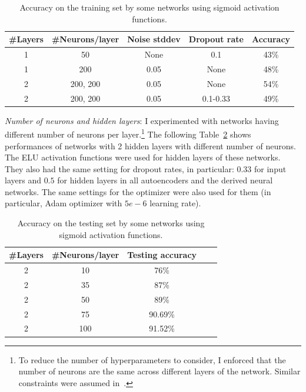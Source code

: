 \documentclass[12pt]{article}
\begin{document}
\begin{table}
\begin{center}
\begin{tabular}{|c|c|c|c|c|}
\hline
\#Layers & \#Neurons/layer & Noise stddev & Dropout rate & Accuracy \\ \hline \hline
1 & 50 & None & 0.1 & 43\% \\ \hline
1 & 200 & 0.05 & None & 48\% \\ \hline
2 & 200, 200 & 0.05 & None & 54\% \\ \hline
2 & 200, 200 & 0.05 & 0.1-0.33 & 49\% \\ \hline
\end{tabular}
\caption{Accuracy on the training set by some networks using sigmoid activation functions.}
\label{tab:replace_sigmoid}
\end{center}
\end{table}

\vspace{5mm}
\noindent
\textit{Number of neurons and hidden layers}: I experimented with networks having different number of neurons per layer.\footnote{To reduce the number of hyperparameters to consider, I enforced that the number of neurons are the same across different layers of the network. Similar constraints were assumed in~\cite{vincent2010stacked}.} The following Table~\ref{tab:refine_neurons} shows performances of networks with 2 hidden layers with different number of neurons. The ELU activation functions were used for hidden layers of these networks. They also had the same setting for dropout rates, in particular: $0.33$ for input layers and $0.5$ for hidden layers in all autoencoders and the derived neural networks. The same settings for the optimizer were also used for them (in particular, Adam optimizer with $5e-6$ learning rate).

\begin{table}
\begin{center}
\begin{tabular}{|c|c|c|c|c|}
\hline
\#Layers & \#Neurons/layer & Testing accuracy \\ \hline \hline
2 & 10 & 76\% \\ \hline
2 & 35 & 87\% \\ \hline
2 & 50 & 89\% \\ \hline
2 & 75 & 90.69\% \\ \hline
2 & 100 & 91.52\% \\ \hline
\end{tabular}
\caption{Accuracy on the testing set by some networks using sigmoid activation functions.}
\label{tab:refine_neurons}
\end{center}
\end{table}
\end{document}

